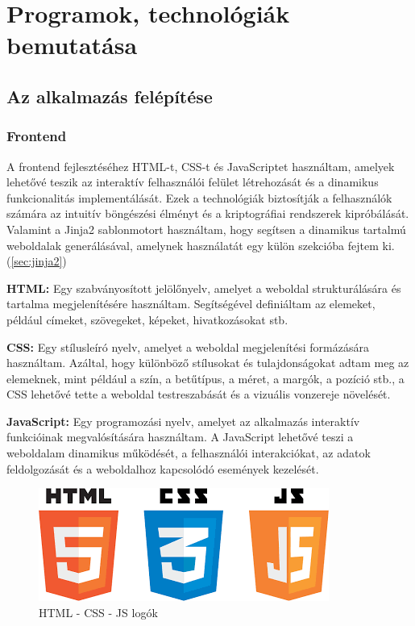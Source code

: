 \chapter{Programok, technológiák bemutatása} \label{fejezet2}

\section {Az alkalmazás felépítése}

\subsection{Frontend}

A frontend fejlesztéséhez HTML-t, CSS-t és JavaScriptet használtam, amelyek lehetővé teszik az interaktív felhasználói felület létrehozását és a dinamikus funkcionalitás implementálását. Ezek a technológiák biztosítják a felhasználók számára az intuitív böngészési élményt és a kriptográfiai rendszerek kipróbálását.
Valamint a Jinja2 sablonmotort használtam, hogy segítsen a dinamikus tartalmú weboldalak generálásával, amelynek használatát egy külön szekcióba fejtem ki. (\ref{sec:jinja2})

\textbf{HTML:}
Egy szabványosított jelölőnyelv, amelyet a weboldal strukturálására és tartalma megjelenítésére használtam. Segítségével definiáltam az elemeket, például címeket, szövegeket, képeket, hivatkozásokat stb.

\textbf{CSS:}
Egy stílusleíró nyelv, amelyet a weboldal megjelenítési formázására használtam. Azáltal, hogy különböző stílusokat és tulajdonságokat adtam meg az elemeknek, mint például a szín, a betűtípus, a méret, a margók, a pozíció stb., a CSS lehetővé tette a weboldal testreszabását és a vizuális vonzereje növelését.

\textbf{JavaScript:}
Egy programozási nyelv, amelyet az alkalmazás interaktív funkcióinak megvalósítására használtam. A JavaScript lehetővé teszi a weboldalam dinamikus működését, a felhasználói interakciókat, az adatok feldolgozását és a weboldalhoz kapcsolódó események kezelését.

\begin{figure}[!h]
	\centering
	\includegraphics[scale=0.3]{images/logoHtmlCssJs}
	\caption{HTML - CSS - JS logók}
\end{figure}


